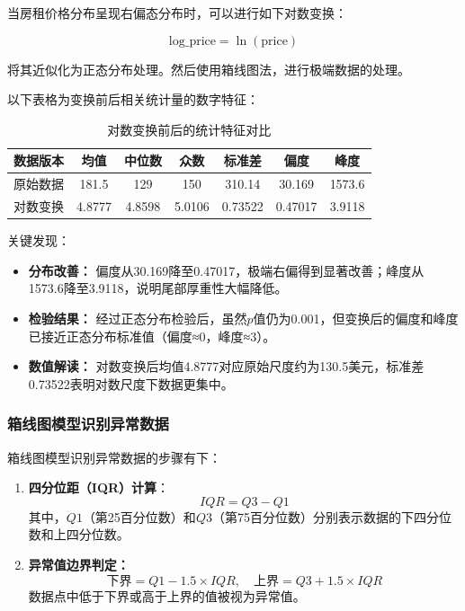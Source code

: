\documentclass[12pt]{article}
\begin{document}
\begin{CJK}{UTF8}{gbsn}
	当房租价格分布呈现右偏态分布时，可以进行如下对数变换：
	
	\begin{equation}
		\text{log\_price} = \ln(\text{price})
	\end{equation}
	
	将其近似化为正态分布处理。然后使用箱线图法，进行极端数据的处理。
	
	以下表格为变换前后相关统计量的数字特征：
	
	\begin{table}[H]
		\centering
		\begin{tabular}{ccccccc}
			\toprule
			数据版本 & 均值 & 中位数 & 众数 & 标准差 & 偏度 & 峰度 \\
			\midrule
			原始数据 & 181.5 & 129 & 150 & 310.14 & 30.169 & 1573.6 \\
			对数变换 & 4.8777 & 4.8598 & 5.0106 & 0.73522 & 0.47017 & 3.9118 \\
			\bottomrule
		\end{tabular}
		\caption{对数变换前后的统计特征对比}
	\end{table}
	
	关键发现：
	\begin{itemize}
		\item \textbf{分布改善：} 偏度从30.169降至0.47017，极端右偏得到显著改善；峰度从\\1573.6降至3.9118，说明尾部厚重性大幅降低。
		\item \textbf{检验结果：} 经过正态分布检验后，虽然$p$值仍为0.001，但变换后的偏度和峰度已接近正态分布标准值（偏度≈0，峰度≈3）。
		\item \textbf{数值解读：} 对数变换后均值4.8777对应原始尺度约为130.5美元，标准差\\0.73522表明对数尺度下数据更集中。
	\end{itemize}
	
	\subsubsection{箱线图模型识别异常数据}
	箱线图模型识别异常数据的步骤有下：
	
	\begin{enumerate}
		\item \textbf{四分位距（IQR）计算}：
		\begin{equation}
		IQR = Q3 - Q1
		\end{equation}
		其中，$Q1$（第25百分位数）和$Q3$（第75百分位数）分别表示数据的下四分位数和上四分位数。
		\item \textbf{异常值边界判定：}
		\begin{equation}
		\text{下界} = Q1 - 1.5 \times IQR, \quad \text{上界} = Q3 + 1.5 \times IQR
	    \end{equation}
		数据点中低于下界或高于上界的值被视为异常值。
	\end{enumerate}
	

\end{CJK}
\end{document}
